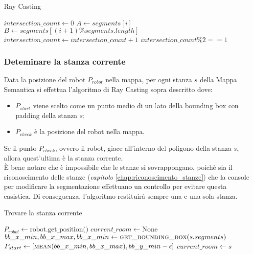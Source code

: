\begin{algorithm}[h]
	\caption{Ray Casting}
	\begin{algorithmic}[1]
		\State $intersection\_count \gets 0$
		\State $A \gets segments[i]$
		\State $B \gets segments[(i+1) \% segments.length]$
		\State $intersection\_count \gets intersection\_count + 1$
		\EndIf
		\EndFor
		\State \Return $intersection\_count \% 2 == 1$
		\EndProcedure
	\end{algorithmic}
\end{algorithm}

\subsubsection{Deteminare la stanza corrente}

Data la posizione del robot $P_{robot}$ nella mappa, per ogni stanza $s$ della Mappa Semantica si effettua l'algoritmo di Ray Casting sopra descritto dove:
\begin{itemize}
	\item $P_{start}$ viene scelto come un punto medio di un lato della bounding box con padding della stanza $s$;
	\item $P_{check}$ è la posizione del robot nella mappa.
\end{itemize}
Se il punto $P_{check}$, ovvero il robot, giace all'interno del poligono della stanza $s$, allora quest'ultima è la stanza corrente. \\
È bene notare che è impossibile che le stanze si sovrappongano, poichè sia il riconoscimento delle stanze (\textit{capitolo} \ref{chap:riconoscimento_stanze}) che la console per modificare la segmentazione effettuano un controllo per evitare questa casistica. Di conseguenza, l'algoritmo restituirà sempre una e una sola stanza.

\begin{algorithm}
	\caption{Trovare la stanza corrente}
	\begin{algorithmic}[1]
		\State $P_{robot} \gets \text{robot.get\_position()}$
		\State $current\_room \gets \text{None}$
		\State $bb\_x\_min, bb\_x\_max, bb\_x\_min \gets \Call{get\_bounding\_box}{s.segments}$
		\State $P_{start} \gets \text{[} \Call{mean}{bb\_x\_min, bb\_x\_max}, bb\_y\_min - \epsilon \text{]}$
		\State $current\_room \gets s$
		\EndIf
		\EndFor
	\end{algorithmic}
\end{algorithm}



